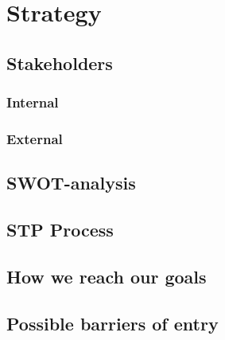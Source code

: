 \chapter{Strategy} \label{strategy}
\section{Stakeholders}
\subsection{Internal}
\subsection{External}
\section{SWOT-analysis}
\section{STP Process}
\section{How we reach our goals}
\section{Possible barriers of entry}
